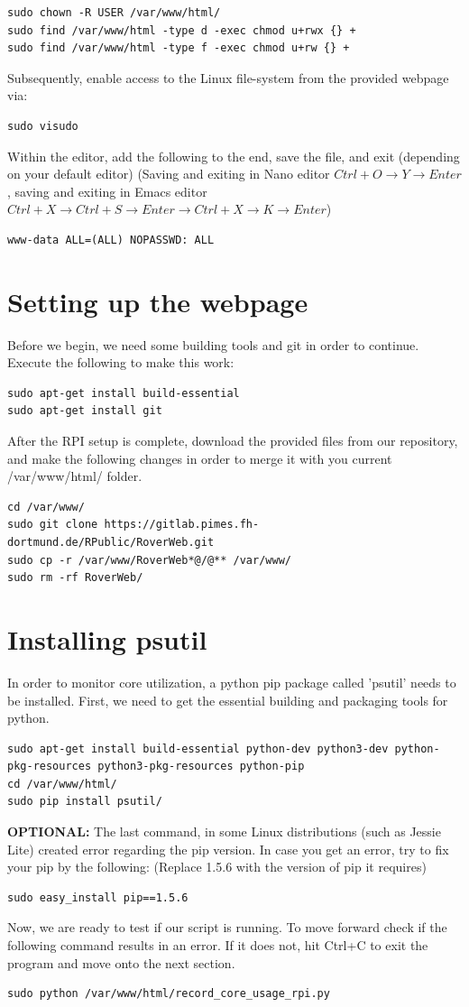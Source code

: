 \begin{lstlisting}
sudo chown -R USER /var/www/html/
sudo find /var/www/html -type d -exec chmod u+rwx {} +
sudo find /var/www/html -type f -exec chmod u+rw {} +
\end{lstlisting}
Subsequently, enable access to the Linux file-system from the provided webpage via:
\begin{lstlisting}
sudo visudo
\end{lstlisting}
Within the editor, add the following to the end, save the file, and exit (depending on your default editor)
(Saving and exiting in Nano editor $Ctrl+O \rightarrow Y \rightarrow Enter$, saving and exiting in Emacs editor $Ctrl + X \rightarrow Ctrl + S \rightarrow Enter \rightarrow Ctrl + X \rightarrow K \rightarrow Enter$) 
\begin{lstlisting}
www-data ALL=(ALL) NOPASSWD: ALL
\end{lstlisting}
\section{Setting up the webpage}
Before we begin, we need some building tools and git in order to continue. Execute the following to make this work:
\begin{lstlisting}
sudo apt-get install build-essential
sudo apt-get install git
\end{lstlisting}
After the RPI setup is complete, download the provided files from our repository, and make the following changes in order to merge it with you current /var/www/html/ folder. 
\begin{lstlisting}
cd /var/www/
sudo git clone https://gitlab.pimes.fh-dortmund.de/RPublic/RoverWeb.git
sudo cp -r /var/www/RoverWeb*@/@** /var/www/
sudo rm -rf RoverWeb/
\end{lstlisting}
\section{Installing psutil}
In order to monitor core utilization, a python pip package called 'psutil' needs to be installed. First, we need to get the essential building and packaging tools for python.
\begin{lstlisting}
sudo apt-get install build-essential python-dev python3-dev python-pkg-resources python3-pkg-resources python-pip
cd /var/www/html/
sudo pip install psutil/
\end{lstlisting}
\textbf{OPTIONAL:} The last command, in some Linux distributions (such as Jessie Lite) created error regarding the pip version. In case you get an error, try to fix your pip by the following: (Replace 1.5.6 with the version of pip it requires) 
\begin{lstlisting}
sudo easy_install pip==1.5.6
\end{lstlisting}
Now, we are ready to test if our script is running. To move forward check if the following command results in an error. If it does not, hit Ctrl+C to exit the program and move onto the next section.
\begin{lstlisting}
sudo python /var/www/html/record_core_usage_rpi.py
\end{lstlisting}
